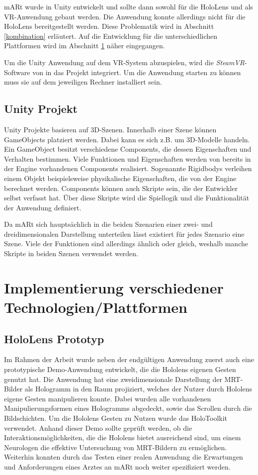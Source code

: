 mARt wurde in Unity entwickelt und sollte dann sowohl für die HoloLens und als VR-Anwendung gebaut werden. Die Anwendung konnte allerdings nicht für die HoloLens bereitgestellt werden. Diese Problematik wird in Abschnitt \ref{kombination} erläutert. Auf die Entwicklung für die unterschiedlichen Plattformen wird im Abschnitt \ref{plattformen} näher eingegangen.

Um die Unity Anwendung auf dem VR-System abzuspielen, wird die \textit{SteamVR}-Software von \citep{steam} in das Projekt integriert. Um die Anwendung starten zu können muss sie auf dem jeweiligen Rechner installiert sein.

\subsection{Unity Projekt}

Unity Projekte basieren auf 3D-Szenen. Innerhalb einer Szene können GameObjects platziert werden. Dabei kann es sich z.B. um 3D-Modelle handeln. Ein GameObject besitzt verschiedene Components, die dessen Eigenschaften und Verhalten bestimmen. Viele Funktionen und Eigenschaften werden von bereits in der Engine vorhandenen Components realisiert. Sogenannte Rigidbodys verleihen einem Objekt beispielsweise physikalische Eigenschaften, die von der Engine berechnet werden. Components können auch Skripte sein, die der Entwickler selbst verfasst hat. Über diese Skripte wird die Spiellogik und die Funktionalität der Anwendung definiert. 

Da mARt sich hauptsächlich in die beiden Szenarien einer zwei- und dreidimensionalen Darstellung unterteilen lässt existiert für jedes Szenario eine Szene.
Viele der Funktionen sind allerdings ähnlich oder gleich, weshalb manche Skripte in beiden Szenen verwendet werden. 


\section{Implementierung verschiedener Technologien/Plattformen}
\label{plattformen}

\subsection{HoloLens Prototyp}
Im Rahmen der Arbeit wurde neben der endgültigen Anwendung zuerst auch eine prototypische Demo-Anwendung entwickelt, die die Hololens eigenen Gesten genutzt hat. Die Anwendung hat eine zweidimensionale Darstellung der MRT-Bilder als Hologramm in den Raum projiziert, welches der Nutzer durch Hololens eigene Gesten manipulieren konnte. Dabei wurden alle vorhandenen Manipulierungsformen eines Hologramms abgedeckt, sowie das Scrollen durch die Bildschichten. Um die Hololens Gesten zu Nutzen wurde das HoloToolkit verwendet. 
Anhand dieser Demo sollte geprüft werden, ob die Interaktionsmöglichkeiten, die die Hololens bietet ausreichend sind, um einem Neurologen die effektive Untersuchung von MRT-Bildern zu ermöglichen.
Weiterhin konnten durch das Testen einer realen Anwendung die Erwartungen und Anforderungen eines Arztes an mARt noch weiter spezifiziert werden.  

